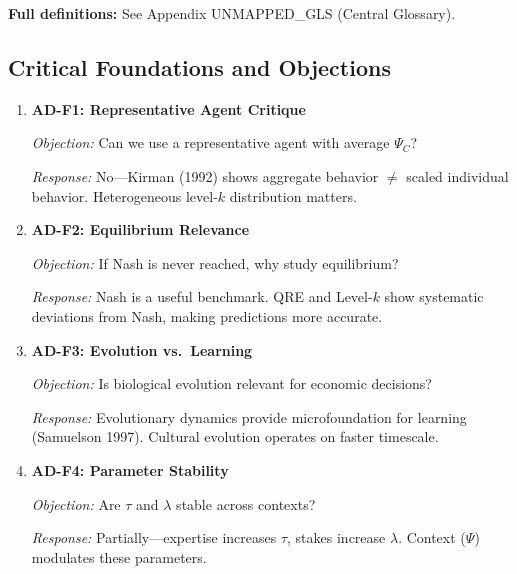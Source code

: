 \textbf{Full definitions:} See Appendix UNMAPPED_GLS (Central Glossary).

\subsection{Critical Foundations and Objections}
\label{sec:ad-foundations}


\begin{enumerate}
    \item \textbf{AD-F1: Representative Agent Critique}

    \textit{Objection:} Can we use a representative agent with average $\Psi_C$?

    \textit{Response:} No---Kirman (1992) shows aggregate behavior $\neq$ scaled
    individual behavior. Heterogeneous level-$k$ distribution matters.

    \item \textbf{AD-F2: Equilibrium Relevance}

    \textit{Objection:} If Nash is never reached, why study equilibrium?

    \textit{Response:} Nash is a useful benchmark. QRE and Level-$k$ show
    systematic deviations from Nash, making predictions more accurate.

    \item \textbf{AD-F3: Evolution vs.\ Learning}

    \textit{Objection:} Is biological evolution relevant for economic decisions?

    \textit{Response:} Evolutionary dynamics provide microfoundation for learning
    (Samuelson 1997). Cultural evolution operates on faster timescale.

    \item \textbf{AD-F4: Parameter Stability}

    \textit{Objection:} Are $\tau$ and $\lambda$ stable across contexts?

    \textit{Response:} Partially---expertise increases $\tau$, stakes increase
    $\lambda$. Context ($\Psi$) modulates these parameters.
\end{enumerate}

